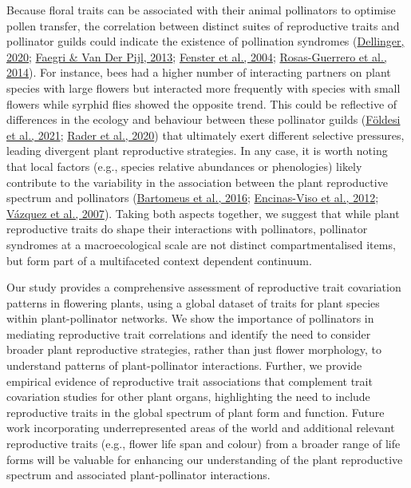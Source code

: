 \documentclass[
  12pt,
  a4paper,
]{article}
\begin{document}
Because floral traits can be associated with their animal pollinators to optimise pollen transfer, the correlation between distinct suites of reproductive traits and pollinator guilds could indicate the existence of pollination syndromes (\protect\hyperlink{ref-dellinger2020}{Dellinger, 2020}; \protect\hyperlink{ref-faegri2013}{Faegri \& Van Der Pijl, 2013}; \protect\hyperlink{ref-fenster2004}{Fenster et al., 2004}; \protect\hyperlink{ref-rosas2014}{Rosas-Guerrero et al., 2014}). For instance, bees had a higher number of interacting partners on plant species with large flowers but interacted more frequently with species with small flowers while syrphid flies showed the opposite trend. This could be reflective of differences in the ecology and behaviour between these pollinator guilds (\protect\hyperlink{ref-foldesi2021}{Földesi et al., 2021}; \protect\hyperlink{ref-rader2020}{Rader et al., 2020}) that ultimately exert different selective pressures, leading divergent plant reproductive strategies. In any case, it is worth noting that local factors (e.g., species relative abundances or phenologies) likely contribute to the variability in the association between the plant reproductive spectrum and pollinators (\protect\hyperlink{ref-bartomeus2016}{Bartomeus et al., 2016}; \protect\hyperlink{ref-encinas2012}{Encinas-Viso et al., 2012}; \protect\hyperlink{ref-vazquez2007}{Vázquez et al., 2007}). Taking both aspects together, we suggest that while plant reproductive traits do shape their interactions with pollinators, pollinator syndromes at a macroecological scale are not distinct compartmentalised items, but form part of a multifaceted context dependent continuum.

Our study provides a comprehensive assessment of reproductive trait covariation patterns in flowering plants, using a global dataset of traits for plant species within plant-pollinator networks. We show the importance of pollinators in mediating reproductive trait correlations and identify the need to consider broader plant reproductive strategies, rather than just flower morphology, to understand patterns of plant-pollinator interactions. Further, we provide empirical evidence of reproductive trait associations that complement trait covariation studies for other plant organs, highlighting the need to include reproductive traits in the global spectrum of plant form and function. Future work incorporating underrepresented areas of the world and additional relevant reproductive traits (e.g., flower life span and colour) from a broader range of life forms will be valuable for enhancing our understanding of the plant reproductive spectrum and associated plant-pollinator interactions.
\end{document}
